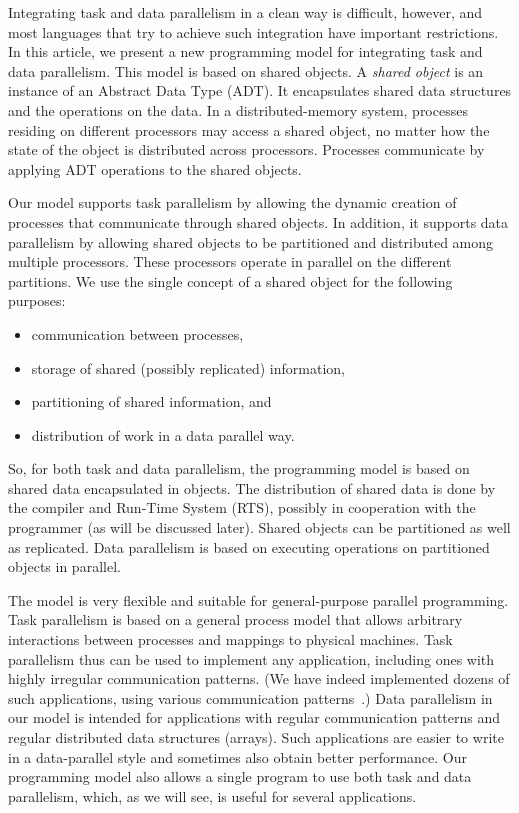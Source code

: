 \documentclass{acmtrans2e}
\begin{document}
Integrating task and data parallelism in a clean way is difficult,
however, and most languages that try to achieve such integration have
important restrictions. In this article, we present a new programming
model for integrating task and data parallelism. This model is based
on shared objects.  A \emph{shared object} is an instance of an
Abstract Data Type (ADT). It encapsulates shared data structures and
the operations on the data. In a distributed-memory system, processes
residing on different processors may access a shared object, no matter
how the state of the object is distributed across
processors. Processes communicate by applying ADT operations to the
shared objects.

Our model supports task parallelism by allowing the dynamic creation
of processes that communicate through shared objects. In addition, it
supports data parallelism by allowing shared objects to be partitioned
and distributed among multiple processors. These processors operate in
parallel on the different partitions. We use the single concept of a
shared object for the following purposes:

\begin{itemize}
\item communication between processes,
\item storage of shared (possibly replicated) information,
\item partitioning of shared information, and
\item distribution of work in a data parallel way.
\end{itemize}

So, for both task and data parallelism, the programming model is based
on shared data encapsulated in objects. The distribution of shared
data is done by the compiler and Run-Time System (RTS), possibly in
cooperation with the programmer (as will be discussed later).  Shared
objects can be partitioned as well as replicated. Data parallelism is
based on executing operations on partitioned objects in parallel.

The model is very flexible and suitable for general-purpose parallel
programming.
Task parallelism is based on a general process model that allows arbitrary
interactions between processes and mappings to physical machines.
Task parallelism thus can be used to implement any application, including
ones with highly irregular communication patterns.
(We have indeed implemented dozens of such applications, using
various communication patterns~\cite{Bal:1998,wilson96}.)
Data parallelism in our model is intended for applications with
regular communication patterns and regular distributed data structures (arrays).
Such applications are easier to write in a data-parallel style and
sometimes also obtain better performance.
Our programming model also allows a single program to use both task and
data parallelism, which, as we will see, is useful for several applications.
\end{document}

